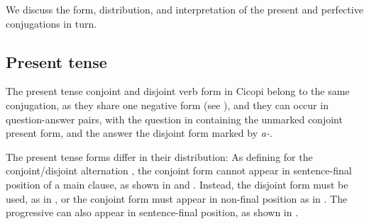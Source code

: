 \documentclass[output=paper]{langscibook}
\begin{document}
We discuss the form, distribution, and interpretation of the present and perfective conjugations in turn.

\subsection{Present tense}
\label{bkm:Ref141367382}
The present tense conjoint and disjoint verb form in Cicopi belong to the same conjugation, as they share one negative form (see ), and they can occur in question-answer pairs, with the question in  containing the unmarked conjoint present form, and the answer the disjoint form marked by \textit{a\nobreakdash-}.

\ea
\label{bkm:Ref141369089}
\begin{xlist}



\end{xlist}
\z

The present tense forms differ in their distribution: As defining for the conjoint/disjoint alternation \citep{vanderWal2017}, the conjoint form cannot appear in sentence-final position of a main clause, as shown in  and . Instead, the disjoint form must be used, as in , or the conjoint form must appear in non-final position as in . The progressive can also appear in sentence-final position, as shown in .
\end{document}
